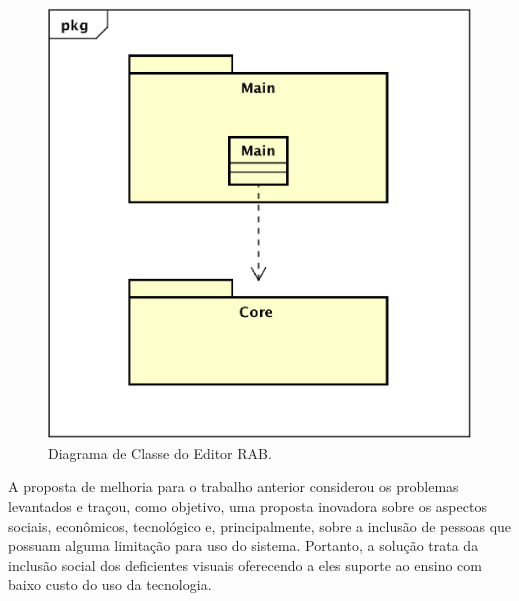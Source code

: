 \begin{figure}[ht]
	\centering
		\includegraphics[keepaspectratio=true,scale=0.5]{figuras/editor.eps}
	\caption{Diagrama de Classe do Editor RAB.}
	\label{editor}
\end{figure}

A proposta de melhoria para o trabalho anterior considerou os problemas levantados e traçou, como objetivo, uma proposta inovadora sobre os aspectos sociais, econômicos, tecnológico e, principalmente, sobre a inclusão de pessoas que possuam alguma limitação para uso do sistema. Portanto, a solução trata da inclusão social dos deficientes visuais oferecendo a eles suporte ao ensino com baixo custo do uso da tecnologia.


